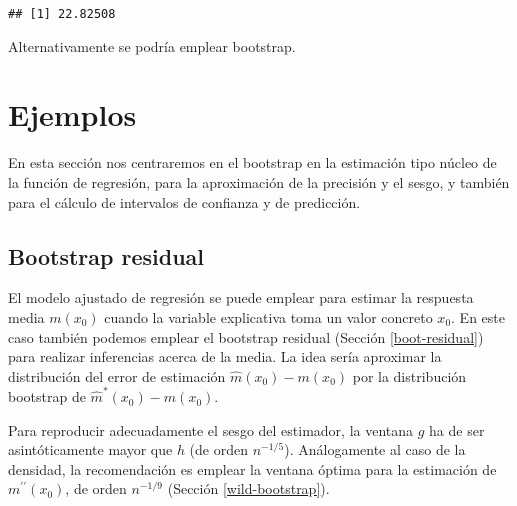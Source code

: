 \documentclass[]{book}
\theoremstyle{break}
\theoremstyle{definition}
\theoremstyle{definition}
\theoremstyle{definition}
\theoremstyle{remark}
\begin{document}
\begin{verbatim}
## [1] 22.82508
\end{verbatim}

Alternativamente se podría emplear bootstrap.

\section{Ejemplos}\label{ejemplos-2}

En esta sección nos centraremos en el bootstrap en la estimación tipo
núcleo de la función de regresión, para la aproximación de la precisión
y el sesgo, y también para el cálculo de intervalos de confianza y de
predicción.

\subsection{Bootstrap residual}\label{bootstrap-residual}

El modelo ajustado de regresión se puede emplear para estimar la
respuesta media \(m(x_0)\) cuando la variable explicativa toma un valor
concreto \(x_0\). En este caso también podemos emplear el bootstrap
residual (Sección \ref{boot-residual}) para realizar inferencias acerca
de la media. La idea sería aproximar la distribución del error de
estimación \(\hat{m}(x_0) - m(x_0)\) por la distribución bootstrap de
\(\hat{m}^{\ast}(x_0) - \hat{m}(x_0)\).

Para reproducir adecuadamente el sesgo del estimador, la ventana \(g\)
ha de ser asintóticamente mayor que \(h\) (de orden \(n^{-1/5}\)).
Análogamente al caso de la densidad, la recomendación es emplear la
ventana óptima para la estimación de
\(m^{\prime \prime }\left( x_0 \right)\), de orden \(n^{-1/9}\) (Sección
\ref{wild-bootstrap}).
\end{document}
